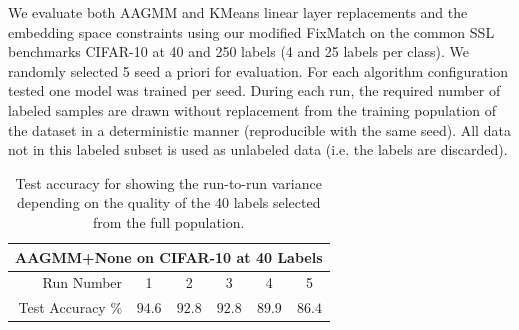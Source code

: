 \documentclass[10pt,twocolumn,letterpaper]{article}
\begin{document}
We evaluate both AAGMM and KMeans linear layer replacements and the embedding space constraints using our modified FixMatch\cite{sohn2020fixmatch} on the common SSL benchmarks CIFAR-10 \cite{cifar10} at 40 and 250 labels (4 and 25 labels per class). 
We randomly selected 5 seed a priori for evaluation.
For each algorithm configuration tested one model was trained per seed.
During each run, the required number of labeled samples are drawn without replacement from the training population of the dataset in a deterministic manner (reproducible with the same seed).
All data not in this labeled subset is used as unlabeled data (i.e. the labels are discarded).



\begin{table}[h!]
	\begin{tabular}{r|c|c|c|c|c}
		\multicolumn{6}{c}{AAGMM+None on CIFAR-10 at 40 Labels}\\
		\hline
		Run Number & 1 & 2 & 3 & 4 & 5 \\
		\hline
		Test Accuracy \% & $94.6$ & $92.8$ & $92.8$ & $89.9$ & $86.4$ \\
	\end{tabular}
	\caption{Test accuracy for showing the run-to-run variance depending on the quality of the 40 labels selected from the full population.}
	\label{tab:runvariability}
\end{table}
\end{document}
